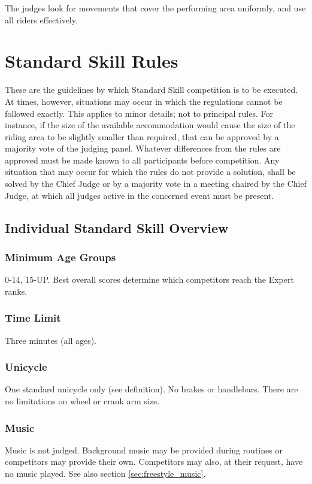 The judges look for movements that cover the performing area uniformly, and use all riders effectively.

\chapter{Standard Skill Rules \label{chap:freestyle_std-skill-rules}}

These are the guidelines by which Standard Skill competition is to be executed.
At times, however, situations may occur in which the regulations cannot be followed exactly.
This applies to minor details; not to principal rules.
For instance, if the size of the available accommodation would cause the size of the riding area to be slightly smaller than required, that can be approved by a majority vote of the judging panel.
Whatever differences from the rules are approved must be made known to all participants before competition.
Any situation that may occur for which the rules do not provide a solution, shall be solved by the Chief Judge or by a majority vote in a meeting chaired by the Chief Judge, at which all judges active in the concerned event must be present.

\section{Individual Standard Skill Overview}

\subsection{Minimum Age Groups}
0-14, 15-UP.
Best overall scores determine which competitors reach the Expert ranks.

\subsection{Time Limit}
Three minutes (all ages).

\subsection{Unicycle}
One standard unicycle only (see definition).
No brakes or handlebars.
There are no limitations on wheel or crank arm size.

\subsection{Music}
Music is not judged.
Background music may be provided during routines or competitors may provide their own.
Competitors may also, at their request, have no music played.
See also section \ref{sec:freestyle_music}.

